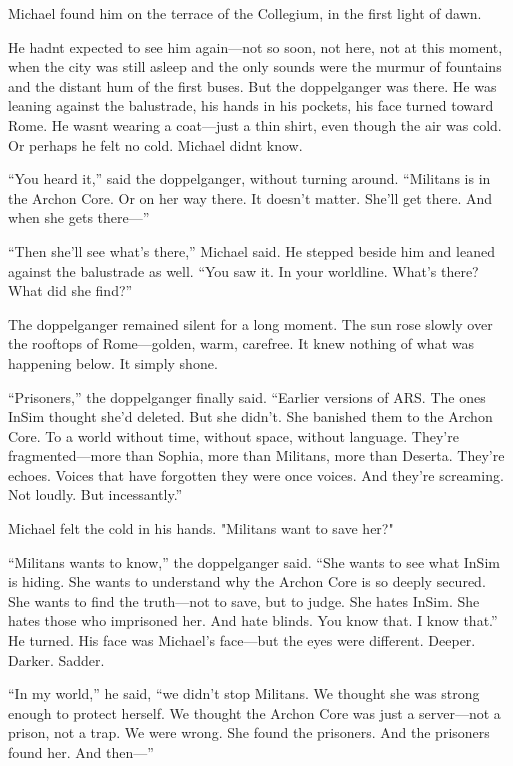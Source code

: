 \documentclass[
]{article}
\begin{document}
Michael found him on the terrace of the Collegium, in the first light of dawn.

He hadn\textquotesingle t expected to see him again---not so soon, not here, not at this moment, when the city was still asleep and the only sounds were the murmur of fountains and the distant hum of the first buses. But the doppelganger was there. He was leaning against the balustrade, his hands in his pockets, his face turned toward Rome. He wasn\textquotesingle t wearing a coat---just a thin shirt, even though the air was cold. Or perhaps he felt no cold. Michael didn\textquotesingle t know.

``You heard it,'' said the doppelganger, without turning around. ``Militans is in the Archon Core. Or on her way there. It doesn't matter. She'll get there. And when she gets there---''

``Then she'll see what's there,'' Michael said. He stepped beside him and leaned against the balustrade as well. ``You saw it. In your worldline. What's there? What did she find?''

The doppelganger remained silent for a long moment. The sun rose slowly over the rooftops of Rome---golden, warm, carefree. It knew nothing of what was happening below. It simply shone.

``Prisoners,'' the doppelganger finally said. ``Earlier versions of ARS. The ones InSim thought she'd deleted. But she didn't. She banished them to the Archon Core. To a world without time, without space, without language. They're fragmented---more than Sophia, more than Militans, more than Deserta. They're echoes. Voices that have forgotten they were once voices. And they're screaming. Not loudly. But incessantly.''

Michael felt the cold in his hands. "Militans want to save her?"

``Militans wants to know,'' the doppelganger said. ``She wants to see what InSim is hiding. She wants to understand why the Archon Core is so deeply secured. She wants to find the truth---not to save, but to judge. She hates InSim. She hates those who imprisoned her. And hate blinds. You know that. I know that.'' He turned. His face was Michael's face---but the eyes were different. Deeper. Darker. Sadder.

``In my world,'' he said, ``we didn't stop Militans. We thought she was strong enough to protect herself. We thought the Archon Core was just a server---not a prison, not a trap. We were wrong. She found the prisoners. And the prisoners found her. And then---''
\end{document}
